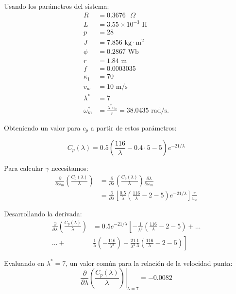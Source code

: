 {Usando los parámetros del sistema:
\begin{align*}
R &= 0.3676 \text{ }\Omega \\
L &= 3.55\times10^{-3} \text{ H} \\
p &= 28 \\
J &= 7.856 \text{ kg}\cdot\text{m}^2 \\
\phi &= 0.2867 \text{ Wb} \\
r &= 1.84 \text{ m} \\
f &= 0.0003035 \\
\kappa_1 &= 70 \\
v_w &= 10 \text{ m/s} \\
\lambda^* &= 7 \\
\omega^*_m &= \frac{\lambda^* v_w}{r} = 38.0435 \text{ rad/s}.
\end{align*}

Obteniendo un valor para $c_p$ a partir de estos parámetros:

\begin{equation}
C_p(\lambda) = 0.5\left(\frac{116}{\lambda} - 0.4\cdot5 - 5\right)e^{-21/\lambda} \label{eq:cp}
\end{equation}

Para calcular $\gamma$ necesitamos:
\begin{align}
\frac{\partial}{\partial \omega_m}\left(\frac{C_p(\lambda)}{\lambda}\right) &= \frac{\partial}{\partial \lambda}\left(\frac{C_p(\lambda)}{\lambda}\right)\frac{\partial \lambda}{\partial \omega_m} \label{eq:gamma_chain} \\
&= \frac{\partial}{\partial \lambda}\left[\frac{0.5}{\lambda}\left(\frac{116}{\lambda} - 2 - 5\right)e^{-21/\lambda}\right]\frac{r}{v_w} \label{eq:gamma_expanded}
\end{align}

Desarrollando la derivada:
\begin{align}
\frac{\partial}{\partial \lambda}\left(\frac{C_p(\lambda)}{\lambda}\right) &= 0.5e^{-21/\lambda}\left[-\frac{1}{\lambda^2}\left(\frac{116}{\lambda} - 2 - 5\right) + \ldots \right.
\\ 
\ldots + &\left.\frac{1}{\lambda}\left(-\frac{116}{\lambda^2}\right) + \frac{21}{\lambda^2}\frac{1}{\lambda}\left(\frac{116}{\lambda} - 2 - 5\right)\right] \label{eq:dcp_dlambda}
\end{align}

Evaluando en $\lambda^* = 7$, un valor común para la relación de la velocidad punta:
\begin{equation}
\left.\frac{\partial}{\partial \lambda}\left(\frac{C_p(\lambda)}{\lambda}\right)\right|_{\lambda=7} = -0.0082 \label{eq:dcp_numeric}
\end{equation}

}
